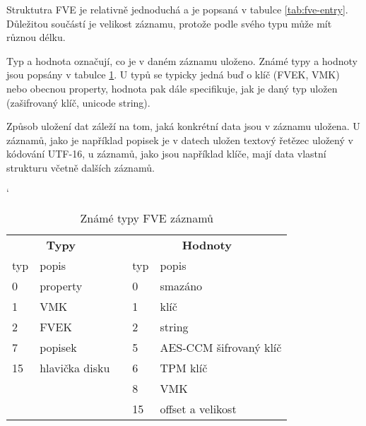 Struktutra FVE je relativně jednoduchá a je popsaná v tabulce \ref{tab:fve-entry}. Důležitou součástí je velikost záznamu, protože podle svého typu může mít různou délku.


Typ a hodnota označují, co je v daném záznamu uloženo. Známé typy a hodnoty jsou popsány v tabulce \ref{tab:fve-entry-types}. U typů se typicky jedná buď o klíč (FVEK, VMK) nebo obecnou property, hodnota pak dále specifikuje, jak je daný typ uložen (zašifrovaný klíč, unicode string).

Způsob uložení dat záleží na tom, jaká konkrétní data jsou v záznamu uložena. U  záznamů, jako je například popisek je v datech uložen textový řetězec uložený v kódování UTF-16, u  záznamů, jako jsou například klíče, mají data vlastní strukturu včetně dalších záznamů.

\begin{table}[h]
\catcode`
\captionsetup{width=0.65\linewidth}
\caption{Známé typy FVE záznamů}
\label{tab:fve-entry-types}
\begin{center}
\centering
\begin{tabular}{|l|l|c|l|l|}
  \cline{1-2} \cline{4-5}
   \multicolumn{2}{|c|}{\textbf{Typy}} &  & \multicolumn{2}{|c|}{\textbf{Hodnoty}} \\ \cline{1-2} \cline{4-5}
   typ & popis &  & typ & popis \\ \cline{1-2} \cline{4-5}
   0 & property & & 0 & smazáno \\ \cline{1-2} \cline{4-5}
   1 & VMK & & 1 & klíč \\ \cline{1-2} \cline{4-5}
   2 & FVEK & & 2 & string \\ \cline{1-2} \cline{4-5}
   7 & popisek & & 5 & AES-CCM šifrovaný klíč \\ \cline{1-2} \cline{4-5}
   15 & hlavička disku\footnotemark & & 6 & TPM klíč \\ \cline{1-2} \cline{4-5}
   \multicolumn{2}{c}{} & & 8 & VMK \\ \cline{4-5}
   \multicolumn{2}{c}{} & & 15 & offset a velikost \\ \cline{4-5}
   

\end{tabular}
\end{center}
\end{table}

